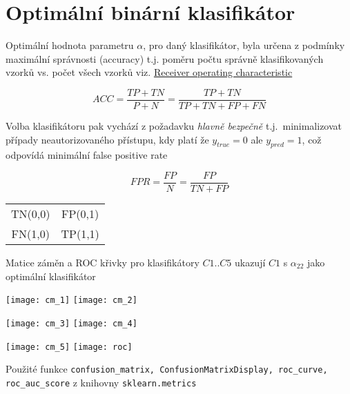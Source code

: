 \documentclass[11pt]{article}
\begin{document}
    \section{Optimální binární klasifikátor}\label{sec:opt_clf}
    Optimální hodnota parametru  $\alpha$, pro daný klasifikátor,
    byla určena z podmínky maximální správnosti (accuracy) t.j. poměru počtu správně
    klasifikovaných vzorků vs. počet všech vzorků viz.
    \href{https://en.wikipedia.org/wiki/Receiver_operating_characteristic}{Receiver operating characteristic}

    \begin{equation}
        ACC = \frac{TP + TN}{P + N} = \frac{TP + TN}{TP + TN + FP + FN}\label{eq:accuracy}
    \end{equation}

    Volba klasifikátoru pak vychází z požadavku {\em hlavně bezpečně} t.j.\
    minimalizovat případy neautorizovaného přístupu, kdy platí že $y_{true}=0$ ale $y_{pred}=1$,
    což odpovídá minimální false positive rate

    \begin{equation}
        FPR = \frac{FP}{N}=\frac{FP}{TN + FP}\label{eq:fpr}
    \end{equation}

    \begin{center}
        \begin{tabular}{ c c }
            TN(0,0) & FP(0,1) \\
            FN(1,0) & TP(1,1) \\
        \end{tabular}
    \end{center}

    Matice záměn a ROC křivky pro klasifikátory $C1..C5$ ukazují $C1$ s $\alpha_{22}$ jako
    optimální klasifikátor

    \texttt{[image: cm\_1]}
    \texttt{[image: cm\_2]}

    \texttt{[image: cm\_3]}
    \texttt{[image: cm\_4]}

    \texttt{[image: cm\_5]}
    \texttt{[image: roc]}

    Použité funkce
    \texttt{confusion\_matrix, ConfusionMatrixDisplay, roc\_curve, roc\_auc\_score}
    z knihovny \texttt{sklearn.metrics}
\end{document}
